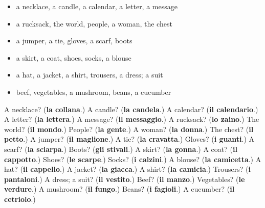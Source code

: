 \begin{itemize}
\raggedright
  \item a necklace, a candle, a calendar, a letter, a message
  \item a rucksack, the world, people, a woman, the chest
  \item a jumper, a tie, gloves, a scarf, boots
  \item a skirt, a coat, shoes, socks, a blouse
  \item a hat, a jacket, a shirt, trousers, a dress; a suit
  \item beef, vegetables, a mushroom, beans, a cucumber
\end{itemize}

\begin{tcolorbox}[breakable,colback=teal!4,colframe=teal!35!black,title={Before you move on}]
A necklace? (\textbf{la collana}.) A candle? (\textbf{la candela}.) A calendar? (\textbf{il calendario}.) A letter? (\textbf{la lettera}.) A message? (\textbf{il messaggio}.) A rucksack? (\textbf{lo zaino}.) The world? (\textbf{il mondo}.) People? (\textbf{la gente}.) A woman? (\textbf{la donna}.) The chest? (\textbf{il petto}.) A jumper? (\textbf{il maglione}.) A tie? (\textbf{la cravatta}.) Gloves? (\textbf{i guanti}.) A scarf? (\textbf{la sciarpa}.) Boots? (\textbf{gli stivali}.) A skirt? (\textbf{la gonna}.) A coat? (\textbf{il cappotto}.) Shoes? (\textbf{le scarpe}.) Socks? (\textbf{i calzini}.) A blouse? (\textbf{la camicetta}.) A hat? (\textbf{il cappello}.) A jacket? (\textbf{la giacca}.) A shirt? (\textbf{la camicia}.) Trousers? (\textbf{i pantaloni}.) A dress; a suit? (\textbf{il vestito}.) Beef? (\textbf{il manzo}.) Vegetables? (\textbf{le verdure}.) A mushroom? (\textbf{il fungo}.) Beans? (\textbf{i fagioli}.) A cucumber? (\textbf{il cetriolo}.)
\end{tcolorbox}
